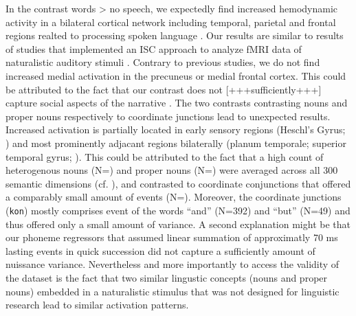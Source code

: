 \documentclass[10pt,a4paper,onecolumn]{article}
\begin{document}
In the contrast words > no speech, we expectedly find increased hemodynamic activity in a bilateral cortical network including temporal, parietal and frontal regions realted to processing spoken language \citep{friederici2011brain, hickok2007cortical,price2012twentyyears}.
Our results are similar to results of studies that implemented an ISC approach to analyze fMRI data of naturalistic auditory stimuli \citep{honey2012not, lerner2011topographic, silbert2014coupled}.
Contrary to previous studies, we do not find increased medial activation in the precuneus or medial frontal cortex. This could be attributed to the fact that our contrast does not [+++sufficiently+++] capture social aspects of the narrative \citep{ferstl2008extended, mar2011neural}.
The two contrasts contrasting nouns and proper nouns respectively to coordinate junctions lead to unexpected results. Increased activation is partially located in early sensory regions (Heschl's Gyrus; \citep{saenz2014tonotopic}) and most prominently adjacant regions bilaterally (planum temporale; superior temporal gyrus; \citep{arsenault2015distributed, mesgarani2014phonetic}).
This could be attributed to the fact that a high count of heterogenous nouns (N=\rNnAll) and proper nouns (N=\rNeAll) were averaged across all 300 semantic dimensions (cf. \citep{mitchell2008predicting, huth2016natural}), and contrasted to coordinate conjunctions that offered a comparably small amount of events (N=\rKonAll).
Moreover, the coordinate junctions (\texttt{kon}) mostly comprises event of the words ``and'' (N=392) and ``but'' (N=49) and thus offered only a small amount of variance.
A second explanation might be that our phoneme regressors that assumed linear summation of approximatly 70 ms lasting events in quick succession did not capture a sufficiently amount of nuissance variance.
Nevertheless and more importantly to access the validity of the dataset is the fact that two similar lingustic concepts (nouns and proper nouns) embedded in a naturalistic stimulus that was not designed for linguistic research lead to similar activation patterns.
\end{document}
